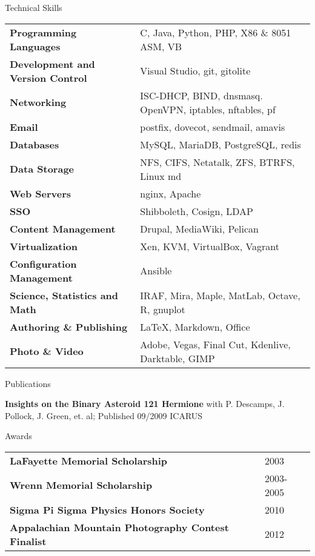 \documentclass{cv} %
\begin{document}
\begin{rSection}{Technical Skills}

\begin{tabular}{ @{} >{\bfseries}l @{\hspace{6ex}} l }
Programming Languages & C, Java, Python, PHP, X86 \& 8051 ASM, VB\\
Development and Version Control & Visual Studio, git, gitolite \\
Networking & ISC-DHCP, BIND, dnsmasq. OpenVPN, iptables, nftables, pf\\
Email & postfix, dovecot, sendmail, amavis\\
Databases & MySQL, MariaDB, PostgreSQL, redis  \\
Data Storage & NFS, CIFS, Netatalk, ZFS, BTRFS, Linux md\\
Web Servers & nginx, Apache\\
SSO & Shibboleth, Cosign, LDAP\\
Content Management & Drupal, MediaWiki, Pelican\\
Virtualization & Xen, KVM, VirtualBox, Vagrant \\
Configuration Management & Ansible \\ 
Science, Statistics and Math & IRAF, Mira, Maple, MatLab, Octave, R, gnuplot\\
Authoring \& Publishing & \LaTeX, Markdown, Office\\
Photo \& Video & Adobe, Vegas, Final Cut, Kdenlive, Darktable, GIMP\\
\end{tabular}

\end{rSection}

\begin{rSection}{Publications}

\textbf{Insights on the Binary Asteroid 121 Hermione} with P. Descamps, J. Pollock, J. Green, et. al; Published 09/2009 ICARUS
\end{rSection}

\begin{rSection}{Awards}

\begin{tabular}{ @{} >{\bfseries}l @{\hspace{6ex}} l }
LaFayette Memorial Scholarship & 2003 \\
Wrenn Memorial Scholarship & 2003-2005 \\
Sigma Pi Sigma Physics Honors Society & 2010 \\
Appalachian Mountain Photography Contest Finalist & 2012 \\

\end{tabular}

\end{rSection}
\end{document}
